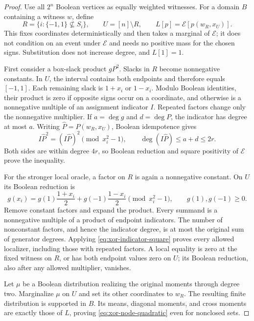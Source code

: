 \begin{proof}
Use all $2^n$ Boolean vertices as equally weighted witnesses. For a domain
$B$ containing a witness $w$, define
\[
 R=\{i:\{-1,1\}\not\subseteq S_i\},\qquad U=[n]\setminus R,
 \qquad L[p]=\mathcal E[p(w_R,x_U)].
\]
This fixes coordinates deterministically and then takes a marginal of
$\mathcal E$; it does not condition on an event under $\mathcal E$ and
needs no positive mass for the chosen signs. Substitution does not
increase degree, and $L[1]=1$.

First consider a box-slack product $gP^2$. Slacks in $R$ become
nonnegative constants. In $U$, the interval contains both endpoints and
therefore equals $[-1,1]$. Each remaining slack is $1+x_i$ or $1-x_i$.
Modulo Boolean identities, their product is zero if opposite signs occur
on a coordinate, and otherwise is a nonnegative multiple of an assignment
indicator $I$. Repeated factors change only the nonnegative multiplier.
If $a=\deg g$ and $d=\deg P$, the indicator has degree at most $a$.
Writing $\widehat P=P(w_R,x_U)$, Boolean idempotence gives
\begin{equation}\label{eq:xor-indicator-square}
 I\widehat P^2=(I\widehat P)^2\pmod{x_i^2-1},\qquad
 \deg(I\widehat P)\le a+d\le2r.
\end{equation}
Both sides are within degree $4r$, so Boolean reduction and square
positivity of $\mathcal E$ prove the inequality.

For the stronger local oracle, a factor on $R$ is again a nonnegative
constant. On $U$ its Boolean reduction is
\begin{equation}\label{eq:xor-local-endpoints}
 g(x_i)=g(1)\frac{1+x_i}{2}+g(-1)\frac{1-x_i}{2}
 \pmod{x_i^2-1},\qquad g(1),g(-1)\ge0.
\end{equation}
Remove constant factors and expand the product. Every summand is a
nonnegative multiple of a product of endpoint indicators. The number of
nonconstant factors, and hence the indicator degree, is at most the
original sum of generator degrees. Applying
\eqref{eq:xor-indicator-square} proves every allowed localizer, including
those with repeated factors. A local equality is zero
at the fixed witness on $R$, or has both endpoint values zero on $U$;
its Boolean reduction, also after any allowed multiplier, vanishes.

Let $\mu$ be a Boolean distribution realizing the original moments through
degree two. Marginalize $\mu$ on $U$ and set its other coordinates to
$w_R$. The resulting finite distribution is supported in $B$. Its means,
diagonal moments, and cross moments are exactly those of $L$, proving
\eqref{eq:xor-node-quadratic} even for nonclosed sets.


\end{proof}
